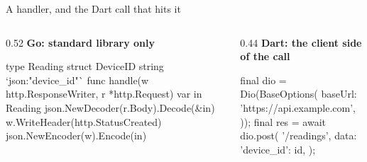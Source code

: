 \documentclass[10pt,aspectratio=169,t]{beamer}
\begin{document}
\begin{frame}[fragile,eyebrow=Go backends]{A handler, and the Dart call that hits it}
  \begin{columns}[T]
    \begin{column}{0.52\textwidth}
      {\bfseries Go: standard library only}\par
\begin{golang}
type Reading struct {
    DeviceID string `json:"device_id"`
}
func handle(w http.ResponseWriter,
    r *http.Request) {
    var in Reading
    json.NewDecoder(r.Body).Decode(&in)
    w.WriteHeader(http.StatusCreated)
    json.NewEncoder(w).Encode(in)
}
\end{golang}
    \end{column}
    \begin{column}{0.44\textwidth}
      {\bfseries Dart: the client side of the call}\par
\begin{dart}
final dio = Dio(BaseOptions(
  baseUrl: 'https://api.example.com',
));
final res = await dio.post(
  '/readings',
  data: {'device_id': id},
);
\end{dart}
    \end{column}
  \end{columns}
\end{frame}
\end{document}
